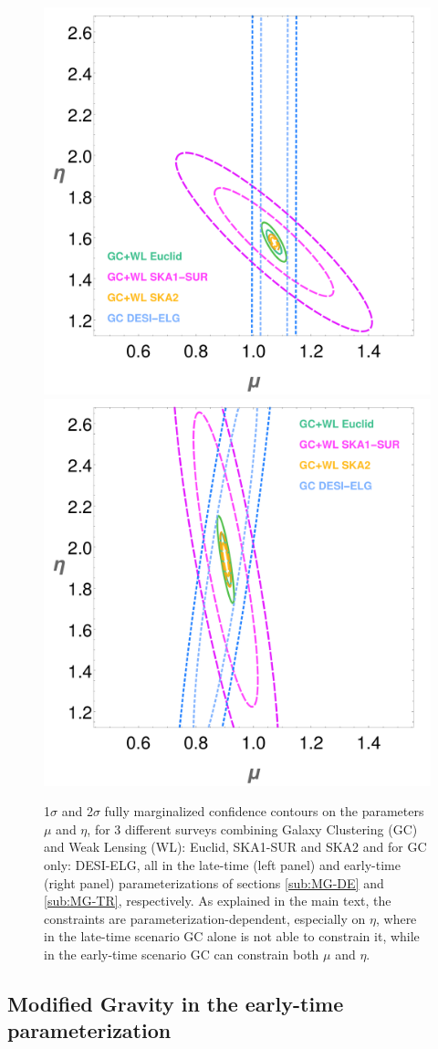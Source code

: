 \begin{figure}[htbp]
\centering
\includegraphics[width=0.45\linewidth]{Chapters/linear-nonlinear-MG-forecasts/figures/ellipses/DE-related/ellipsesPlot-withLegend-Ska2-SKA1-Euclid-DESI-MuEtaFisher-Marged-fiducialMGDE2nonuhs-GC+WL--nlHS-pars-6-7_-FixedRange.pdf}
\includegraphics[width=0.45\linewidth]{Chapters/linear-nonlinear-MG-forecasts/figures/ellipses/T-related/ellipsesPlot-withLegend-MuEtaFisher-Marged-AllSurveys-SKA1-SKA2-Euclid-DESI-fiducialMGTR2nonuhs-GC_GC+WL--nlHS-pars-6-7_-FixedRange.pdf}
\caption[Fisher confidence contours for future surveys in the late- and early-time parameterizations.]{\label{fig:combined_surveys}
1$\sigma$ and 2$\sigma$
fully marginalized confidence contours on the parameters
$\mu$ and $\eta$, for 3 different surveys combining Galaxy Clustering (GC) and Weak Lensing (WL): Euclid, SKA1-SUR
and SKA2 and for GC only: DESI-ELG, all in the late-time (left panel) and early-time (right panel) parameterizations
of sections \ref{sub:MG-DE} and \ref{sub:MG-TR}, respectively.
As explained in the main text, the constraints are parameterization-dependent, especially on $\eta$, where in
the late-time scenario GC alone is not able to constrain it, while in the early-time scenario GC can constrain both $\mu$ and $\eta$.
}
\end{figure}

\subsection{\label{sub:MG-TR} Modified Gravity in the early-time parameterization}

